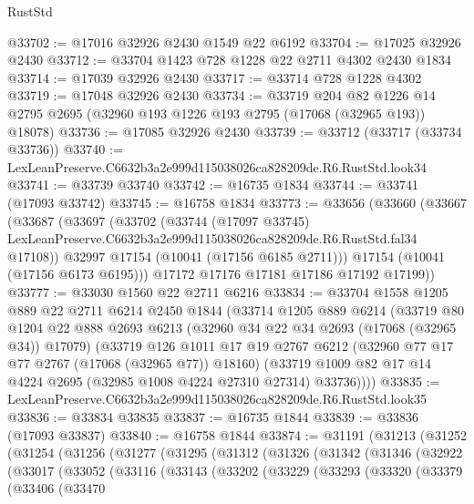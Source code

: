 \begin{lexlean}{RustStd}
\begin{coremodule}
@33702 := @17016 @32926 @2430 @1549 @22 @6192
@33704 := @17025 @32926 @2430
@33712 := @33704 @1423 @728 @1228 @22 @2711 @4302 @2430 @1834
@33714 := @17039 @32926 @2430
@33717 := @33714 @728 @1228 @4302
@33719 := @17048 @32926 @2430
@33734 := @33719
    @204
    @82
    @1226
    @14
    @2795
    @2695
    (@32960 @193 @1226 @193 @2795 (@17068 (@32965 @193)) @18078)
@33736 := @17085 @32926 @2430
@33739 := @33712 (@33717 (@33734 @33736))
@33740 := LexLeanPreserve.C6632b3a2e999d115038026ca828209de.R6.RustStd.look34
@33741 := @33739 @33740
@33742 := @16735 @1834
@33744 := @33741 (@17093 @33742)
@33745 := @16758 @1834
@33773 := @33656
    (@33660
      (@33667
        (@33687
          (@33697
            (@33702
              (@33744
                (@17097 @33745)
                LexLeanPreserve.C6632b3a2e999d115038026ca828209de.R6.RustStd.fal34
                @17108))
            @32997
            @17154
            (@10041 (@17156 @6185 @2711)))
          @17154
          (@10041 (@17156 @6173 @6195)))
        @17172
        @17176
        @17181
        @17186
        @17192
        @17199))
@33777 := @33030 @1560 @22 @2711 @6216
@33834 := @33704
    @1558
    @1205
    @889
    @22
    @2711
    @6214
    @2450
    @1844
    (@33714
      @1205
      @889
      @6214
      (@33719
        @80
        @1204
        @22
        @888
        @2693
        @6213
        (@32960 @34 @22 @34 @2693 (@17068 (@32965 @34)) @17079)
        (@33719
          @126
          @1011
          @17
          @19
          @2767
          @6212
          (@32960 @77 @17 @77 @2767 (@17068 (@32965 @77)) @18160)
          (@33719 @1009 @82 @17 @14 @4224 @2695 (@32985 @1008 @4224 @27310 @27314) @33736))))
@33835 := LexLeanPreserve.C6632b3a2e999d115038026ca828209de.R6.RustStd.look35
@33836 := @33834 @33835
@33837 := @16735 @1844
@33839 := @33836 (@17093 @33837)
@33840 := @16758 @1844
@33874 := @31191
    (@31213
      (@31252
        (@31254
          (@31256
            (@31277
              (@31295
                (@31312
                  (@31326
                    (@31342
                      (@31346
                        (@32922
                          (@33017
                            (@33052
                              (@33116
                                (@33143
                                  (@33202
                                    (@33229
                                      (@33293
                                        (@33320
                                          (@33379
                                            (@33406
                                              (@33470

\end{coremodule}
\end{lexlean}
